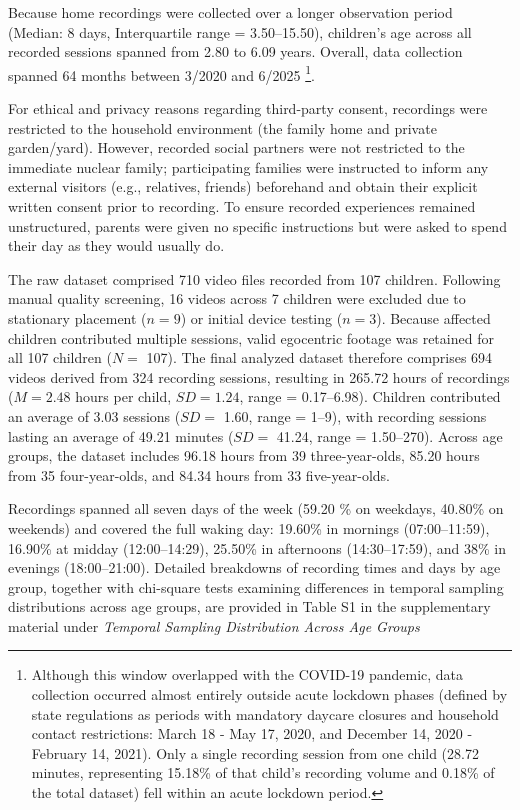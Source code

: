 \documentclass[
  english,
  12pt,
  man,floatsintext]{apa6}
\begin{document}
Because home recordings were collected over a longer observation period (Median: 8 days, Interquartile range = 3.50--15.50), children's age across all recorded sessions spanned from 2.80 to 6.09 years. Overall, data collection spanned 64 months between 3/2020 and 6/2025 \footnote{Although this window overlapped with the COVID-19 pandemic, data collection occurred almost entirely outside acute lockdown phases (defined by state regulations as periods with mandatory daycare closures and household contact restrictions: March 18 - May 17, 2020, and December 14, 2020 - February 14, 2021). Only a single recording session from one child (28.72 minutes, representing 15.18\% of that child's recording volume and 0.18\% of the total dataset) fell within an acute lockdown period.}.

For ethical and privacy reasons regarding third-party consent, recordings were restricted to the household environment (the family home and private garden/yard). However, recorded social partners were not restricted to the immediate nuclear family; participating families were instructed to inform any external visitors (e.g., relatives, friends) beforehand and obtain their explicit written consent prior to recording. To ensure recorded experiences remained unstructured, parents were given no specific instructions but were asked to spend their day as they would usually do.

The raw dataset comprised 710 video files recorded from 107 children. Following manual quality screening, 16 videos across 7 children were excluded due to stationary placement (\(n=9\)) or initial device testing (\(n=3\)). Because affected children contributed multiple sessions, valid egocentric footage was retained for all 107 children (\(N=\) 107). The final analyzed dataset therefore comprises 694 videos derived from 324 recording sessions, resulting in 265.72 hours of recordings (\(M = 2.48\) hours per child, \(SD = 1.24\), range = 0.17--6.98). Children contributed an average of 3.03 sessions (\(SD=\) 1.60, range = 1--9), with recording sessions lasting an average of 49.21 minutes (\(SD=\) 41.24, range = 1.50--270). Across age groups, the dataset includes 96.18 hours from 39 three-year-olds, 85.20 hours from 35 four-year-olds, and 84.34 hours from 33 five-year-olds.

Recordings spanned all seven days of the week (59.20 \% on weekdays, 40.80\% on weekends) and covered the full waking day: 19.60\% in mornings (07:00--11:59), 16.90\% at midday (12:00--14:29), 25.50\% in afternoons (14:30--17:59), and 38\% in evenings (18:00--21:00). Detailed breakdowns of recording times and days by age group, together with chi-square tests examining differences in temporal sampling distributions across age groups, are provided in Table S1 in the supplementary material under \emph{Temporal Sampling Distribution Across Age Groups}
\end{document}
